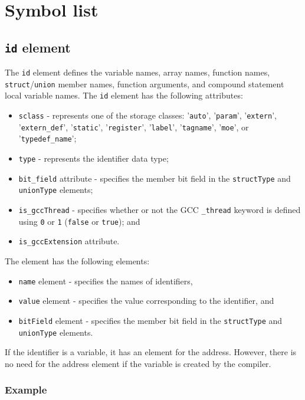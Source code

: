 \section{Symbol list}


\subsection{ {\tt id} element}

The {\tt id} element defines the variable names, array names, function names, {\tt struct}/{\tt union} member names, function arguments, and compound statement local variable names. The {\tt id} element has the following attributes:

\begin{itemize}
\item {\tt sclass} - represents one of the storage classes: '{\tt auto}', '{\tt param}', '{\tt extern}', '{\tt extern\_def}', '{\tt static}', '{\tt register}', '{\tt label}', '{\tt tagname}', '{\tt moe}', or '{\tt typedef\_name}';
\item {\tt type} - represents the identifier data type;
\item {\tt bit\_field} attribute - specifies the member bit field in the {\tt structType} and {\tt unionType} elements;
\item {\tt is\_gccThread} - specifies whether or not the GCC {\tt \_thread} keyword is defined using {\tt 0} or {\tt 1} ({\tt false} or {\tt true}); and
\item {\tt is\_gccExtension} attribute.
\end{itemize}

The element has the following elements:

\begin{itemize}
\item {\tt name} element - specifies the names of identifiers,
\item {\tt value} element - specifies the value corresponding to the identifier, and
\item {\tt bitField} element - specifies the member bit field in the {\tt structType} and {\tt unionType} elements.
\end{itemize}

If the identifier is a variable, it has an element for the address. However, there is no need for the address element if the variable is created by the compiler.

\subsubsection*{Example}

